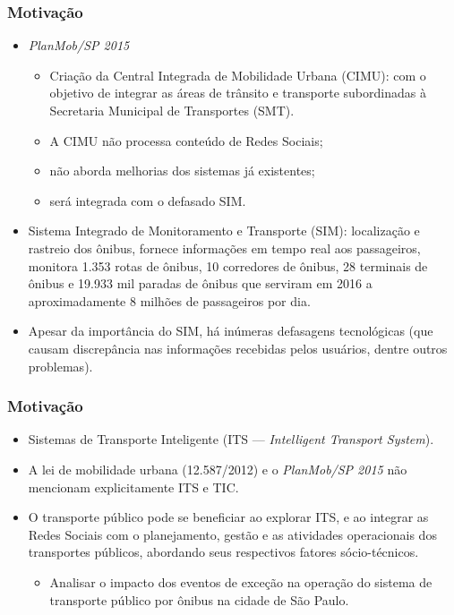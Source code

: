\documentclass{beamer}
\begin{document}
\begin{frame}
\frametitle{Motivação}
\begin{itemize}
\item \textit{PlanMob/SP 2015}
\begin{itemize}
\item Criação da Central Integrada de Mobilidade Urbana (CIMU): com o objetivo de integrar as áreas de trânsito e transporte subordinadas à Secretaria Municipal de Transportes (SMT).
\item A CIMU não processa conteúdo de Redes Sociais;
\item não aborda melhorias dos sistemas já existentes;
\item será integrada com o defasado SIM.
\end{itemize}
\end{itemize}

\begin{itemize}
\item Sistema Integrado de Monitoramento e Transporte (SIM): localização e rastreio dos ônibus, fornece informações em tempo real aos passageiros, monitora 1.353 rotas de ônibus, 10 corredores de ônibus, 28 terminais de ônibus e 19.933 mil paradas de ônibus que serviram em 2016 a aproximadamente 8 milhões de passageiros por dia. \item Apesar da importância do SIM, há inúmeras defasagens tecnológicas (que causam discrepância nas informações recebidas pelos usuários, dentre outros problemas).
\end{itemize}
\end{frame}
\begin{frame}
\frametitle{Motivação}
\begin{itemize}
\item Sistemas de Transporte Inteligente (ITS --- \textit{Intelligent Transport System}).
\item A lei de mobilidade urbana (12.587/2012) e o \textit{PlanMob/SP 2015} não mencionam explicitamente ITS e TIC.
\end{itemize}
\begin{itemize}
\item O transporte público pode se beneficiar ao explorar ITS, e ao integrar as Redes Sociais com o planejamento, gestão e as atividades operacionais dos transportes públicos, abordando seus respectivos fatores sócio-técnicos.
\begin{itemize}
\item Analisar o impacto dos eventos de exceção na operação do sistema de transporte público por ônibus na cidade de São Paulo.
\end{itemize}
\end{itemize}
\end{frame}
\end{document}
